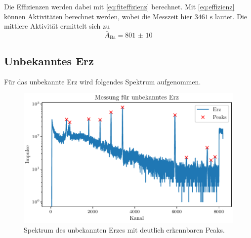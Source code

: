 Die Effizienzen werden dabei mit \eqref{eq:fiteffizienz} berechnet. Mit \eqref{eq:effizienz} 
können Aktivitäten berechnet werden, wobei die Messzeit hier $\qty{3461}{\second}$ lautet. Die mittlere Aktivität ermittelt sich zu
\begin{equation}
    \bar{A}_\text{Ba} = \num{801(10)}
\end{equation}

\subsection{Unbekanntes Erz}

Für das unbekannte Erz wird folgendes Spektrum aufgenommen.

\begin{figure}[H]
    \centering
    \includegraphics[width=\textwidth]{plots/H.pdf}
    \caption{Spektrum des unbekannten Erzes mit deutlich erkennbaren Peaks.}
    \label{fig:erz}
\end{figure}

